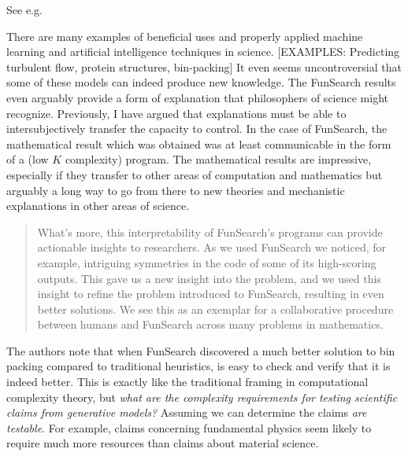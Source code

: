 \documentclass[11pt, oneside]{article}   	%
\begin{document}
See e.g. \citep[\S 26]{Carnap1966} 





There are many examples of beneficial uses and properly applied machine learning and artificial intelligence techniques in science.  [EXAMPLES: Predicting turbulent flow, protein structures, bin-packing]  It even seems uncontroversial that some of these models can indeed produce new knowledge.  \citep{FunSearch2024}  The FunSearch results even arguably provide a form of explanation that philosophers of science might recognize.  Previously, I have argued that explanations must be able to intersubjectively transfer the capacity to control.  In the case of FunSearch, the mathematical result which was obtained was at least communicable in the form of a (low $K$ complexity) program. The mathematical results are impressive, especially if they transfer to other areas of computation and mathematics but arguably a long way to go from there to new theories and mechanistic explanations in other areas of science.  


\begin{quote}
    What’s more, this interpretability of FunSearch’s programs can provide actionable insights to researchers. As we used FunSearch we noticed, for example, intriguing symmetries in the code of some of its high-scoring outputs. This gave us a new insight into the problem, and we used this insight to refine the problem introduced to FunSearch, resulting in even better solutions. We see this as an exemplar for a collaborative procedure between humans and FunSearch across many problems in mathematics.

    \citep{FunSearch2024}
\end{quote}


The authors note that when FunSearch discovered a much better solution to bin packing compared to traditional heuristics, is easy to check and verify that it is indeed better.  This is exactly like the traditional framing in computational complexity theory, but \emph{what are the complexity requirements for testing scientific claims from generative models?}  Assuming we can determine the claims \emph{are testable}.  For example, claims concerning fundamental physics seem likely to require much more resources than claims about material science.
\end{document}
